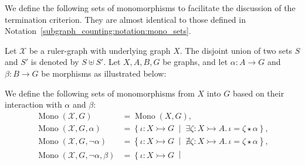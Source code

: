 
We define the following sets of monomorphisms to facilitate the discussion of the termination criterion. They are almost identical to those defined in Notation~\ref{subgraph_counting:notation:mono_sets}. 
\begin{notation}
    \label{antipattern:notation:mono_sets}
  Let \( \mathcal{X}\) be a ruler-graph with underlying graph $X$. The disjoint union of two sets \( S \) and \( S' \) is denoted by \( S \uplus S' \). Let \( X, A, B, G \) be graphs, and let \( \alpha \mathop{\colon} A \mathop{\to} G \) and \( \beta \mathop{\colon} B \mathop{\to} G \) be morphisms as illustrated below:
  \begin{center}
    \end{center}
     We define the following sets of monomorphisms from $X$ into $G$ based on their interaction with $\alpha$ and $\beta$:    
    \begin{align*}
        \operatorname{Mono}(\mathcal{X},G) &= \operatorname{Mono}(X,G), 
        \\
        \operatorname{Mono}(\mathcal{X},G,\alpha) &= \left\{ \iota \mathop{\colon} X \rightarrowtail G 
        \;\middle|\; 
        \exists \zeta \mathop{\colon} X \rightarrowtail A.\, \iota \mathop{=} \zeta \mathop{\star} \alpha \right\}, 
        \\
        \operatorname{Mono}(\mathcal{X},G,\mathop{\lnot} \alpha) &= \left\{ \iota \mathop{\colon} X \rightarrowtail G 
        \;\middle|\; 
        \nexists \zeta \mathop{\colon} X \rightarrowtail A.\, \iota \mathop{=} \zeta \mathop{\star} \alpha \right\}, 
        \\
        \operatorname{Mono}(\mathcal{X},G,\mathop{\lnot} \alpha, \beta) &= \left\{ 
            \iota \mathop{\colon} X \rightarrowtail G \;\middle|\; 
                \begin{aligned}  

\end{aligned}
\end{align*}
\end{notation}

